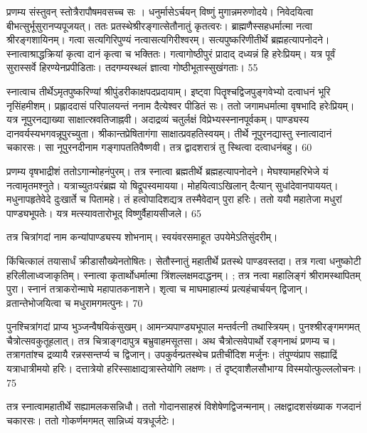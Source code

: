   प्रणम्य संस्तुवन् स्तोत्रैरापौषमवसच्च सः ।
 धनुर्मासेऽर्चयन् विष्णुं मुगान्नमरुणोदये।
 निवेदयित्वा बीभत्सुर्भूसुरानप्यपूजयत्।
 ततः प्रतस्थेश्रीरङ्गात्सेतौनातुं कृतत्वरः।
 ब्राह्मणैस्सहधर्मात्मा नत्वा श्रीरङ्गशायिनम्।
 गत्वा सत्यगिरिपुण्यं नत्वासत्यगिरीश्वरम्।
 सत्यपुष्करिणीतीर्थे ब्रह्महत्यापनोदने।
 स्नात्वाश्राद्धक्रियां कृत्वा दानं कृत्वा च भक्तितः।
 गत्वागोष्ठीपुरं प्रादाद् दध्यन्नं हि हरेःप्रियम्।
 यत्र पूर्वं सुरास्सर्वे हिरण्येनप्रपीडिताः।
 तदगम्यस्थलं ज्ञात्वा गोष्ठीभूतास्सुखंगताः।
 55

  स्नात्वाच तीर्थेऽमृतपुष्करिण्यां
श्रीपुंडरीकाक्षपदप्रदायाम्।
 इष्ट्वा पितॄश्चद्विजपुङ्गवेभ्यो
दत्वाधनं भूरि नृसिंहमीशम्।
 प्रह्लाददासं परिपालयन्तं ननाम
दैत्येश्वर पीडितं सः।
 ततो जगामधर्मात्मा वृषभादि हरेःप्रियम्।
 यत्र नूपुरनद्याख्या साक्षात्स्रवतिजाह्नवी।
 अदाद्रव्यं चतुर्लक्षं विप्रेभ्यस्स्नानपूर्वकम्।
 पाण्ड्यस्य दानवर्यस्यभगवन्नूपुरच्युता।
 श्रीकान्तप्रेषितागंगा साक्षात्प्रवहतिस्वयम्।
 तीर्थे नूपुरनद्यास्तु स्नात्वादानं चकारसः।
 सा नूपुरनदीनाम गङ्गापततिवैष्णवी।
 तत्र द्वादशरात्रं तु स्थित्वा दत्वाधनंबहु।
 60

  प्रणम्य वृषभाद्रीशं ततोऽगान्मोहनंपुरम्।
 तत्र स्नात्वा ब्रह्मतीर्थे ब्रह्महत्यापनोदने।
 मेघश्यामहरिभेजे यं नत्वामृतमश्नुते।
 यत्राच्युतःपरंब्रह्म यो षिद्रूपस्वमायया।
 मोहयित्वाऽखिलान् दैत्यान् सुधांदेवानपाययत्।
 मधुनापहृतेवेदे दुःखार्ते च पितामहे।
 तं हत्वोपादिशद्यत्र तस्मैवेदान् पुरा हरिः।
 ततो ययौ महातेजा मधुरां पाण्ड्यभूपतेः।
 यत्र मत्स्यावतारोभूद् विष्णुर्वैहायसीजले।
 65

  तत्र चित्रांगदां नाम कन्यांपाण्ड्यस्य शोभनाम्।
 स्वयंवरसमाहूत उपयेमेऽतिसुंदरीम्।
 
किंचित्कालं तयासार्धं क्रीडासौख्येनतोषितः।
 सेतौस्नातुं महातीर्थे प्रतस्थे पाण्डवस्तदा।
 तत्र गत्वा धनुष्कोटी हरिलीलाध्वजाकृतिम्।
 स्नात्वा कृतार्थोधर्मात्मा त्रिंशल्लक्षमदाद्धनम्।
 ; तत्र नत्वा महालिङ्गं श्रीरामस्थापितम् पुरा।
 स्नानं तत्राकरोन्माघे महापातकनाशने।
 शृत्वा च माघमाहात्म्यं प्रत्यहंचार्चयन् द्विजान्।
 व्रतान्तेभोजयित्वा च मधुरामगमत्पुनः।
 70

  पुनश्चित्रांगदां प्राप्य भुञ्जन्वैषयिकंसुखम्।
 आमन्त्र्यपाण्ड्यभूपाल मन्तर्वत्नी तथास्त्रियम्।
 पुनश्श्रीरङ्गमगमत् चैत्रोत्सवकुतूहलात्।
 तत्र चित्राङ्गदापुत्र बभ्रुवाहमसूतसा।
 अथ चैत्रोत्सवेपार्थो रङ्गनाथं प्रणम्य च।
 तत्रागतांश्च द्रव्यायै रन्नस्सन्तर्प्य च द्विजान्।
 उपकुर्वन्प्रतस्थेच प्रतीचींदिश मर्जुनः।
 तंपुण्यंप्राप सह्याद्रिं यत्राधात्रीमयो हरिः।
 दत्तात्रेयो हरिस्साक्षाद्यत्रास्तेयोगि लक्षणः।
 तं दृष्ट्वाशैलसौभाग्य विस्मयोत्फुल्ललोचनः।
 75

  तत्र स्नात्वामहातीर्थे सह्यामलकसन्निधौ।
 ततो गोदानसाहस्रं विशेषेणद्विजन्मनाम्।
 लक्षद्वादशसंख्याक गजदानं चकारसः।
 ततो गोकर्णमगमत् सान्निध्यं यत्रधूर्जटेः।
 
